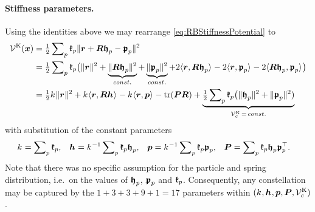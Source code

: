 \paragraph{Stiffness parameters.}
Using the identities above we may rearrange \eqref{eq:RBStiffnessPotential} to
\begin{align}\label{eq:RBStiffnessPotential2}
 \potentialStiff(\sysCoord) &= \tfrac{1}{2} \sumParticles \particleStiffness{\PidxI} \norm{\r + \R \particleBodyPos{\PidxI} - \springHubPos{\PidxI}}^2
\nonumber\\
 &= \tfrac{1}{2} \sumParticles \particleStiffness{\PidxI} \big( \norm{\r}^2 + \underbrace{\norm{\R \particleBodyPos{\PidxI}}^2}_{\const} + \underbrace{\norm{\springHubPos{\PidxI}}^2}_{\const} + 2\sProd{\r}{\R \particleBodyPos{\PidxI}} - 2\sProd{\r}{\springHubPos{\PidxI}} - 2\sProd{\R \particleBodyPos{\PidxI}}{\springHubPos{\PidxI}}\big)
\nonumber\\
 &= \tfrac{1}{2} \bodyStiffness{}{}\norm{\r}^2 + \bodyStiffness{}{} \sProd{\r}{\R \bodyCOS{}{}} - \bodyStiffness{}{} \sProd{\r}{\tuple{p}} - \tr(\mat{P} \R)
  + \underbrace{\tfrac{1}{2} \sumParticles \particleStiffness{\PidxI} \big( \norm{\particleBodyPos{\PidxI}}^2 + \norm{\springHubPos{\PidxI}}^2)}_{\potentialStiff_c\,=\,\const}
\end{align}
with substitution of the constant parameters
\begin{align}
 \bodyStiffness{}{} &= \sumParticles \particleStiffness{\PidxI},&
 \bodyCOS{}{} &= \bodyStiffness{}{}^{-1} \sumParticles \particleStiffness{\PidxI} \particleBodyPos{\PidxI},&
 \tuple{p} &= \bodyStiffness{}{}^{-1} \sumParticles \particleStiffness{\PidxI} \springHubPos{\PidxI},&
 \mat{P} &= \sumParticles \particleStiffness{\PidxI} \particleBodyPos{\PidxI} \springHubPos{\PidxI}^\top.
\end{align}
Note that there was no specific assumption for the particle and spring distribution, i.e.\ on the values of $\boldsymbol{\mathfrak{h}}_{p}$, $\boldsymbol{\mathfrak{p}}_{p}$ and $\mathfrak{k}_{p}$.
Consequently, any constellation may be captured by the $1+3+3+9+1=17$ parameters within $(\bodyStiffness{}{}, \bodyCOS{}{}, \tuple{p}, \mat{P}, \potentialStiff_c)$.

